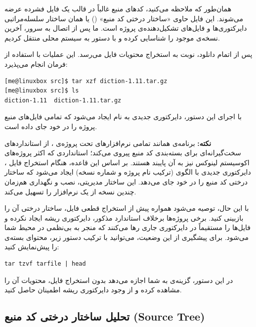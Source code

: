 همان‌طور که ملاحظه می‌کنید، کدهای منبع غالباً در قالب یک فایل  فشرده عرضه می‌شوند. این فایل حاوی «ساختار درختی کد منبع» () یا همان ساختار سلسله‌مراتبی دایرکتوری‌ها و فایل‌های تشکیل‌دهنده‌ی پروژه است. ما پس از اتصال به سرور، آخرین نسخه‌ی موجود را شناسایی کرده و با دستور  به سیستم محلی منتقل کردیم.

پس از اتمام دانلود، نوبت به استخراج محتویات فایل  می‌رسد. این عملیات با استفاده از فرمان  انجام می‌پذیرد:

\begin{latin}
\begin{lstlisting}
[me@linuxbox src]$ tar xzf diction-1.11.tar.gz
[me@linuxbox src]$ ls
diction-1.11  diction-1.11.tar.gz
\end{lstlisting}
\end{latin}

با اجرای این دستور، دایرکتوری جدیدی به نام  ایجاد می‌شود که تمامی فایل‌های منبع پروژه را در خود جای داده است.

\begin{note}
\textbf{نکته:} برنامه‌ی  همانند تمامی نرم‌افزارهای تحت پروژه‌ی ، از استانداردهای سخت‌گیرانه‌ای برای بسته‌بندی کد منبع پیروی می‌کند؛ استانداردی که اکثر پروژه‌های اکوسیستم لینوکس نیز به آن پایبند هستند. بر اساس این قاعده، هنگام استخراج فایل ، دایرکتوری جدیدی با الگوی  (ترکیب نام پروژه و شماره نسخه) ایجاد می‌شود که ساختار درختی کد منبع را در خود جای می‌دهد. این ساختار مدیریتی، نصب و نگهداری هم‌زمان چندین نسخه از یک نرم‌افزار را تسهیل می‌کند.
\end{note}

با این حال، توصیه می‌شود همواره پیش از استخراج قطعی فایل، ساختار درختی آن را بازبینی کنید. برخی پروژه‌ها برخلاف استاندارد مذکور، دایرکتوری ریشه ایجاد نکرده و فایل‌ها را مستقیماً در دایرکتوری جاری رها می‌کنند که منجر به بی‌نظمی در محیط  شما می‌شود. برای پیشگیری از این وضعیت، می‌توانید با ترکیب دستور زیر، محتوای بسته‌ی  را پیش‌نمایش کنید:

\begin{latin}
\begin{lstlisting}
tar tzvf tarfile | head
\end{lstlisting}
\end{latin}

در این دستور، گزینه‌ی  به شما اجازه می‌دهد بدون استخراج فایل، محتویات آن را مشاهده کرده و از وجود دایرکتوری ریشه اطمینان حاصل کنید.

\subsection{تحلیل ساختار درختی کد منبع (Source Tree)}

